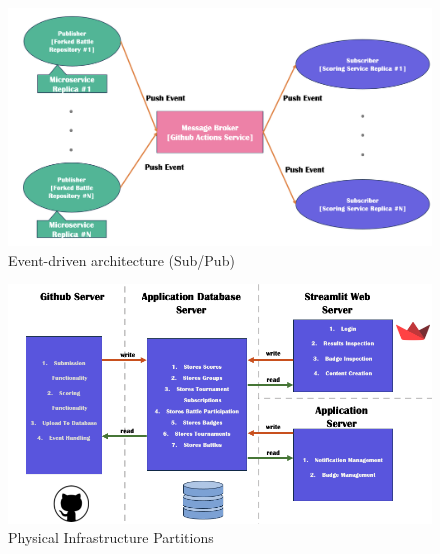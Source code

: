 \begin{figure}[H]
    \centering
    \includegraphics[width=\textwidth]{Graphics/Architecture/EventFlow.png}
    \caption{Event-driven architecture (Sub/Pub)}
    \label{fig:EventFlow}
\end{figure}


\begin{figure}[H]
    \centering
    \includegraphics[width=\textwidth]{Graphics/Architecture/Physical Partitions.png}
    \caption{Physical Infrastructure Partitions}
    \label{fig:physicalpartitions}
\end{figure}


